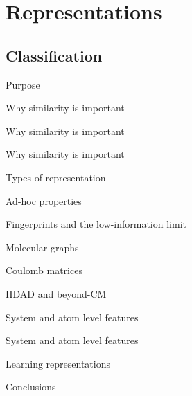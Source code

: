 
\section{Representations}
\subsection{Classification}
\begin{frame}[t]{Purpose}

\end{frame}
\begin{frame}[t]{Why similarity is important}

\end{frame}
\begin{frame}[t]{Why similarity is important}

\end{frame}
\begin{frame}[t]{Why similarity is important}

\end{frame}
\begin{frame}[t]{Types of representation}

\end{frame}
\begin{frame}[t]{Ad-hoc properties}

\end{frame}
\begin{frame}[t]{Fingerprints and the low-information limit}

\end{frame}
\begin{frame}[t]{Molecular graphs}

\end{frame}

\begin{frame}[t]{Coulomb matrices}

\end{frame}
\begin{frame}[t]{HDAD and beyond-CM}

\end{frame}

\begin{frame}[t]{System and atom level features}

\end{frame}

\begin{frame}[t]{System and atom level features}

\end{frame}

\begin{frame}[t]{Learning representations}

\end{frame}

\begin{frame}[t]{Conclusions}

\end{frame}
